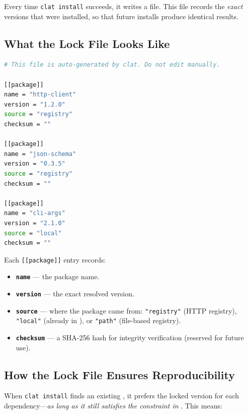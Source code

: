 Every time \texttt{clat install} succeeds, it writes a  file.
This file records the \emph{exact} versions that were installed, so that future installs produce identical results.

\subsection{What the Lock File Looks Like}\label{subsec:lock-format}

\begin{lstlisting}[language=bash, numbers=none, caption={A typical lattice.lock}]
# This file is auto-generated by clat. Do not edit manually.

[[package]]
name = "http-client"
version = "1.2.0"
source = "registry"
checksum = ""

[[package]]
name = "json-schema"
version = "0.3.5"
source = "registry"
checksum = ""

[[package]]
name = "cli-args"
version = "2.1.0"
source = "local"
checksum = ""
\end{lstlisting}

Each \texttt{[[package]]} entry records:

\begin{itemize}[nosep]
  \item \textbf{\texttt{name}} --- the package name.
  \item \textbf{\texttt{version}} --- the exact resolved version.
  \item \textbf{\texttt{source}} --- where the package came from: \texttt{"registry"} (HTTP registry), \texttt{"local"} (already in ), or \texttt{"path"} (file-based registry).
  \item \textbf{\texttt{checksum}} --- a SHA-256 hash for integrity verification (reserved for future use).
\end{itemize}

\subsection{How the Lock File Ensures Reproducibility}\label{subsec:lock-reproducibility}

When \texttt{clat install} finds an existing , it prefers the locked version for each dependency---\emph{as long as it still satisfies the constraint in }.
This means:


